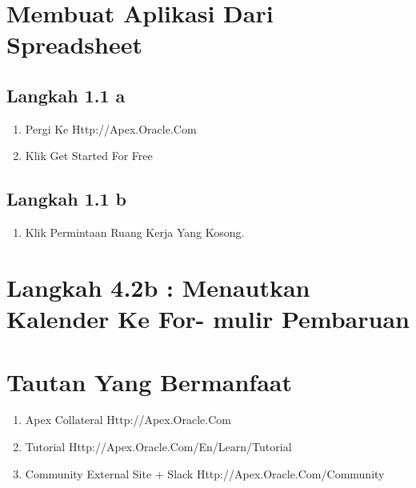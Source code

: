 \documentclass{article}
\begin{document}
\section{Membuat Aplikasi Dari Spreadsheet}
\subsection{Langkah 1.1 a}
\begin{enumerate}
    \item Pergi Ke Http://Apex.Oracle.Com
    \item Klik Get Started For Free
\end{enumerate}
\subsection{Langkah 1.1 b}
\begin{enumerate}
    \item Klik Permintaan Ruang Kerja Yang Kosong. 
\end{enumerate}
\section{Langkah 4.2b : Menautkan Kalender Ke For- mulir Pembaruan}
\usepackage {Note: Anda Mungkin Harus Menavigasi Ke Bulan Mei Untuk Melihat Entri Kalender}
\section{Tautan Yang Bermanfaat}
\begin{enumerate}
    \item Apex Collateral Http://Apex.Oracle.Com
    \item Tutorial Http://Apex.Oracle.Com/En/Learn/Tutorial
    \item Community External Site + Slack Http://Apex.Oracle.Com/Community
\end{enumerate}
\end{document}
